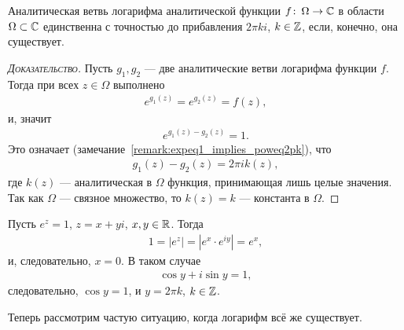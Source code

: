 \documentclass[../complex-analysis.tex]{subfiles}
\begin{document}
\begin{prop}
 Аналитическая ветвь логарифма аналитической функции $ f\colon\,\Omega\to\mathbb{C} $ в области~$ \Omega \subset\mathbb{C} $ единственна с точностью до прибавления $ 2\pi k i $, $ k \in \mathbb{Z} $, если, конечно, она существует.
\end{prop}
\begin{proof}[\normalfont\textsc{Доказательство}]
 Пусть $ g_1,g_2 $ --- две аналитические ветви логарифма функции $ f $. Тогда при всех $ z \in \Omega $ выполнено
 \begin{align*}
  e^{g_1(z)} = e^{g_2(z)} = f(z),
 \end{align*} и, значит
 \begin{align*}
  e^{g_1(z) - g_2(z)} = 1.
 \end{align*} Это означает (замечание~\ref{remark:expeq1_implies_poweq2pk}), что
 \begin{align*}
  g_1(z) - g_2(z) = 2\pi i k(z),
 \end{align*} где $ k(z) $ --- аналитическая в $ \Omega $ функция, принимающая лишь целые значения. Так как $ \Omega $ --- связное множество, то $ k(z) = k $ --- константа в $ \Omega $.
\end{proof}
\begin{remrk}
 \label{remark:expeq1_implies_poweq2pk}
 Пусть $ e^{z} = 1 $, $ z = x+yi $, $ x,y\in\mathbb{R} $. Тогда
 \begin{align*}
  1 = \left| e^{z} \right| = \left| e^{x} \cdot e^{iy} \right| = e^{x},
 \end{align*} и, следовательно, $ x = 0 $. В таком случае
 \begin{align*}
  \cos y + i \sin y = 1,
 \end{align*} следовательно, $ \cos y = 1 $, и $ y = 2\pi k $, $ k \in \mathbb{Z} $.
\end{remrk}

Теперь рассмотрим частую ситуацию, когда логарифм всё же существует.
\end{document}
